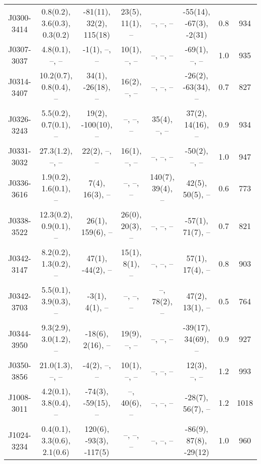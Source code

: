 \documentclass{mnras}
\begin{document}
\begin{table*}
\begin{tabular}{cccccccc}
J0300-3414 & 0.8(0.2), 3.6(0.3), 0.3(0.2) & -81(11), 32(2), 115(18) & 23(5), 11(1), -- & --, --, -- & -55(14), -67(3), -2(31) & 0.8 & 934 \\ 

J0307-3037 & 4.8(0.1), --, -- & -1(1), --, -- & 10(1), --, -- & --, --, -- & -69(1), --, -- & 1.0 & 935 \\ 

J0314-3407 & 10.2(0.7), 0.8(0.4), -- & 34(1), -26(18), -- & 16(2), --, -- & --, --, -- & -26(2), -63(34), -- & 0.7 & 827 \\ 

J0326-3243 & 5.5(0.2), 0.7(0.1), -- & 19(2), -100(10), -- & --, --, -- & 35(4), --, -- & 37(2), 14(16), -- & 0.9 & 934 \\ 

J0331-3032 & 27.3(1.2), --, -- & 22(2), --, -- & 16(1), --, -- & --, --, -- & -50(2), --, -- & 1.0 & 947 \\ 

J0336-3616 & 1.9(0.2), 1.6(0.1), -- & 7(4), 16(3), -- & --, --, -- & 140(7), 39(4), -- & 42(5), 50(5), -- & 0.6 & 773 \\ 

J0338-3522 & 12.3(0.2), 0.9(0.1), -- & 26(1), 159(6), -- & 26(0), 20(3), -- & --, --, -- & -57(1), 71(7), -- & 0.7 & 821 \\ 

J0342-3147 & 8.2(0.2), 1.3(0.2), -- & 47(1), -44(2), -- & 15(1), 8(1), -- & --, --, -- & 57(1), 17(4), -- & 0.8 & 903 \\ 

J0342-3703 & 5.5(0.1), 3.9(0.3), -- & -3(1), 4(1), -- & --, --, -- & --, 78(2), -- & 47(2), 13(1), -- & 0.5 & 764 \\ 

J0344-3950 & 9.3(2.9), 3.0(1.2), -- & -18(6), 2(16), -- & 19(9), --, -- & --, --, -- & -39(17), 34(69), -- & 0.9 & 927 \\ 

J0350-3856 & 21.0(1.3), --, -- & -4(2), --, -- & 10(1), --, -- & --, --, -- & 12(3), --, -- & 1.2 & 993 \\ 

J1008-3011 & 4.2(0.1), 3.8(0.4), -- & -74(3), -59(15), -- & --, 40(6), -- & --, --, -- & -28(7), 56(7), -- & 1.2 & 1018 \\ 

J1024-3234 & 0.4(0.1), 3.3(0.6), 2.1(0.6) & 120(6), -93(3), -117(5) & --, --, -- & --, --, -- & -86(9), 87(8), -29(12) & 1.0 & 960 \\ 


\end{tabular}
\end{table*}
\end{document}
